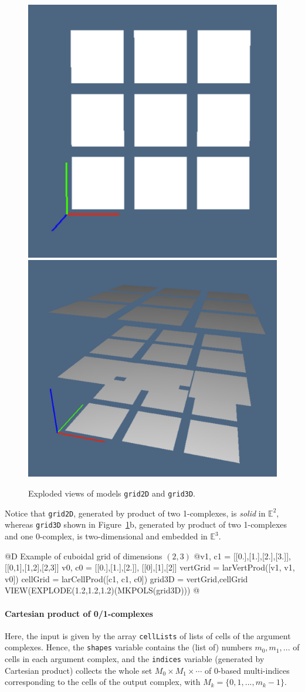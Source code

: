 \documentclass[11pt,oneside]{article}	%
\def\E{\mathbb{E}}
\begin{document}
\begin{figure}[htbp] %
   \centering
   \includegraphics[width=0.458\linewidth]{images/grid2D} 
   \includegraphics[width=0.532\linewidth]{images/grid3D} 
   \caption{Exploded views of models \texttt{grid2D} and \texttt{grid3D}.}
   \label{fig:firstgrid23D}
\end{figure}

Notice that \texttt{grid2D}, generated by product of two 1-complexes, is \emph{solid} in $\E^2$, whereas \texttt{grid3D} shown in Figure~\ref{fig:firstgrid23D}b, generated by product of two 1-complexes and one 0-complex, is two-dimensional and embedded in $\E^3$.

@D Example of cuboidal grid of dimensions $(2,3)$ 
@{v1, c1 = [[0.],[1.],[2.],[3.]],[[0,1],[1,2],[2,3]]
v0, c0 = [[0.],[1.],[2.]], [[0],[1],[2]]
vertGrid = larVertProd([v1, v1, v0])
cellGrid = larCellProd([c1, c1, c0])
grid3D = vertGrid,cellGrid
VIEW(EXPLODE(1.2,1.2,1.2)(MKPOLS(grid3D)))
@}

\paragraph{Cartesian product of 0/1-complexes}
Here, the input is given by the array \texttt{cellLists} of lists of cells of the argument complexes. Hence, the \texttt{shapes} variable contains the (list of) numbers $m_0, m_1, ...$ of cells in each argument complex, and the \texttt{indices} variable (generated by Cartesian product) collects the whole set $M_0 \times M_1 \times \cdots$ of 0-based multi-indices corresponding to the cells of the output complex, with $M_k = \{0,1,...,m_{k}-1\}$.
\end{document}

